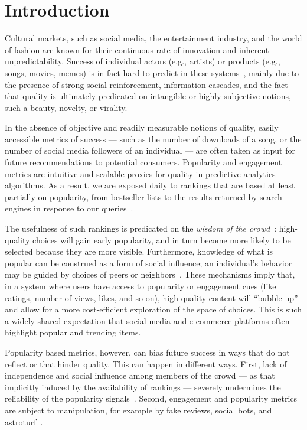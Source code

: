 

\section*{Introduction}

Cultural markets, such as social media, the entertainment industry, and the world of fashion are known for their continuous rate of innovation and inherent unpredictability. Success of individual actors (e.g., artists) or products (e.g., songs, movies, memes) is in fact hard to predict in these systems~\cite{Weng2012,Lilian2013srep,Park:2016:SAI:2818048.2820065}, mainly due to the presence of strong social reinforcement, information cascades, and the fact that quality is ultimately predicated on intangible or highly subjective notions, such a beauty, novelty, or virality.

In the absence of objective and readily measurable notions of quality, easily accessible metrics of success --- such as the number of downloads of a song, or the number of social media followers of an individual --- are often taken as input for future recommendations to potential consumers. Popularity and engagement metrics are intuitive and scalable proxies for quality in predictive analytics algorithms. As a result, we are exposed daily to rankings that are based at least partially on popularity, from bestseller lists to the results returned by search engines in response to our queries~\cite{Brin98}. 

The usefulness of such rankings is predicated on the \emph{wisdom of the crowd}~\cite{Surowiecki:2005}: high-quality choices will gain early popularity, and in turn become more likely to be selected because they are more visible. Furthermore, knowledge of what is popular can be construed as a form of social influence; an individual's behavior may be guided by choices of peers or neighbors~\cite{muchnik2013social,lerman2014leveraging,lorenz2011social,krumme2012quantifying,salganik2006experimental,bakshy2011everyone,christakis2009connected}. 
%
These mechanisms imply that, in a system where users have access to popularity or engagement cues (like ratings, number of views, likes, and so on), high-quality content will ``bubble up'' and allow for a more cost-efficient exploration of the space of choices. This is such a widely shared expectation that social media and e-commerce platforms often highlight popular and trending items. 

Popularity based metrics, however, can bias future success in ways that do not reflect or that hinder quality. 
This can happen in different ways. First, lack of independence and social influence among members of the crowd --- as that implicitly induced by the availability of rankings ---  severely undermines the reliability of the popularity signals~\cite{Lorenz31052011}. Second, engagement and popularity metrics are subject to manipulation, for example by fake reviews, social bots, and astroturf~\cite{Truthy_icwsm2011class,socialbots-CACM}. 

